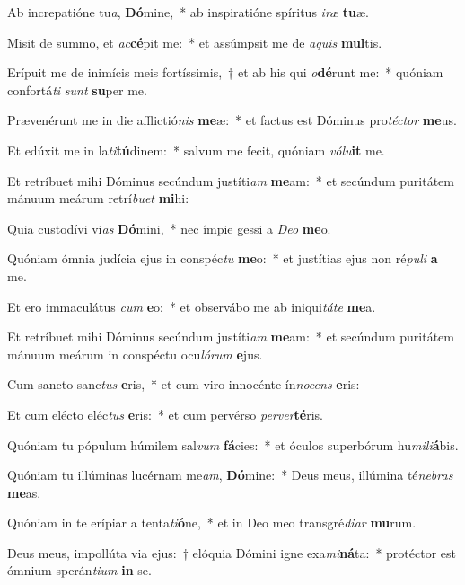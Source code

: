 \item Ab increpatióne tu\textit{a}, \textbf{Dó}mine,~* ab inspiratióne spíritus \textit{i}\textit{ræ} \textbf{tu}æ.
\item Misit de summo, et \textit{ac}\textbf{cé}pit me:~* et assúmpsit me de \textit{a}\textit{quis} \textbf{mul}tis.
\item Erípuit me de inimícis meis fortíssimis,~† et ab his qui \textit{o}\textbf{dé}runt me:~* quóniam confortá\textit{ti} \textit{sunt} \textbf{su}per me.
\item Prævenérunt me in die afflictió\textit{nis} \textbf{me}æ:~* et factus est Dóminus pro\textit{téc}\textit{tor} \textbf{me}us.
\item Et edúxit me in la\textit{ti}\textbf{tú}dinem:~* salvum me fecit, quóniam \textit{vó}\textit{lu}\textbf{it} me.
\item Et retríbuet mihi Dóminus secúndum justíti\textit{am} \textbf{me}am:~* et secúndum puritátem mánuum meárum retrí\textit{bu}\textit{et} \textbf{mi}hi:
\item Quia custodívi vi\textit{as} \textbf{Dó}mini,~* nec ímpie gessi a \textit{De}\textit{o} \textbf{me}o.
\item Quóniam ómnia judícia ejus in conspéc\textit{tu} \textbf{me}o:~* et justítias ejus non ré\textit{pu}\textit{li} \textbf{a} me.
\item Et ero immaculátus \textit{cum} \textbf{e}o:~* et observábo me ab iniqui\textit{tá}\textit{te} \textbf{me}a.
\item Et retríbuet mihi Dóminus secúndum justíti\textit{am} \textbf{me}am:~* et secúndum puritátem mánuum meárum in conspéctu ocu\textit{ló}\textit{rum} \textbf{e}jus.
\item Cum sancto sanc\textit{tus} \textbf{e}ris,~* et cum viro innocénte ín\textit{no}\textit{cens} \textbf{e}ris:
\item Et cum elécto eléc\textit{tus} \textbf{e}ris:~* et cum pervérso \textit{per}\textit{ver}\textbf{té}ris.
\item Quóniam tu pópulum húmilem sal\textit{vum} \textbf{fá}cies:~* et óculos superbórum hu\textit{mi}\textit{li}\textbf{á}bis.
\item Quóniam tu illúminas lucérnam me\textit{am}, \textbf{Dó}mine:~* Deus meus, illúmina té\textit{ne}\textit{bras} \textbf{me}as.
\item Quóniam in te erípiar a tenta\textit{ti}\textbf{ó}ne,~* et in Deo meo transgré\textit{di}\textit{ar} \textbf{mu}rum.
\item Deus meus, impollúta via ejus:~† elóquia Dómini igne exa\textit{mi}\textbf{ná}ta:~* protéctor est ómnium sperán\textit{ti}\textit{um} \textbf{in} se.
